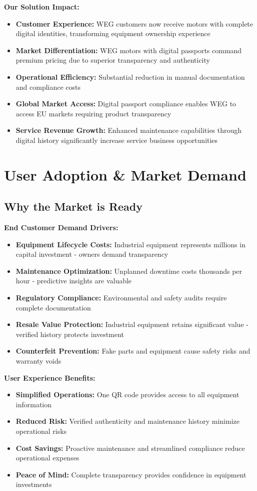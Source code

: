 \documentclass[11pt,a4paper]{article}
\begin{document}
\textbf{Our Solution Impact:}
\begin{itemize}[leftmargin=0.5cm]
    \item \textbf{Customer Experience:} WEG customers now receive motors with complete digital identities, transforming equipment ownership experience
    \item \textbf{Market Differentiation:} WEG motors with digital passports command premium pricing due to superior transparency and authenticity
    \item \textbf{Operational Efficiency:} Substantial reduction in manual documentation and compliance costs  
    \item \textbf{Global Market Access:} Digital passport compliance enables WEG to access EU markets requiring product transparency
    \item \textbf{Service Revenue Growth:} Enhanced maintenance capabilities through digital history significantly increase service business opportunities
\end{itemize}

\section{User Adoption \& Market Demand}

\subsection{Why the Market is Ready}

\textbf{End Customer Demand Drivers:}
\begin{itemize}[leftmargin=0.5cm]
    \item \textbf{Equipment Lifecycle Costs:} Industrial equipment represents millions in capital investment - owners demand transparency
    \item \textbf{Maintenance Optimization:} Unplanned downtime costs thousands per hour - predictive insights are valuable
    \item \textbf{Regulatory Compliance:} Environmental and safety audits require complete documentation
    \item \textbf{Resale Value Protection:} Industrial equipment retains significant value - verified history protects investment
    \item \textbf{Counterfeit Prevention:} Fake parts and equipment cause safety risks and warranty voids
\end{itemize}

\textbf{User Experience Benefits:}
\begin{itemize}[leftmargin=0.5cm]
    \item \textbf{Simplified Operations:} One QR code provides access to all equipment information
    \item \textbf{Reduced Risk:} Verified authenticity and maintenance history minimize operational risks
    \item \textbf{Cost Savings:} Proactive maintenance and streamlined compliance reduce operational expenses
    \item \textbf{Peace of Mind:} Complete transparency provides confidence in equipment investments
\end{itemize}
\end{document}
